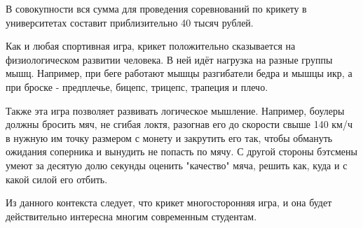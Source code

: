 В совокупности вся сумма для проведения соревнований по крикету в университетах составит приблизительно 40 тысяч рублей.

Как и любая спортивная игра, крикет положительно сказывается на физиологическом развитии человека. В ней идёт нагрузка на разные группы мышц. Например, при беге работают мышцы разгибатели бедра и мышцы икр, а при броске - предплечье, бицепс, трицепс, трапеция и плечо.

Также эта игра позволяет развивать логическое мышление. Например, боулеры должны бросить мяч, не сгибая локтя, разогнав его до скорости свыше 140 км/ч в нужную им точку размером с монету и закрутить его так, чтобы обмануть ожидания соперника и вынудить не попасть по мячу. С другой стороны бэтсмены умеют за десятую долю секунды оценить "качество" мяча, решить как, куда и с какой силой его отбить.

Из данного контекста следует, что крикет многосторонняя игра, и она будет действительно интересна многим современным студентам. \cite{cricet}